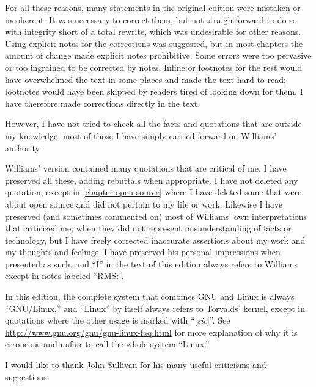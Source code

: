 \ifdefined\chs

\fi

\ifdefined\eng
For all these reasons, many statements in the original edition were
mistaken or incoherent.  It was necessary to correct them, but not
straightforward to do so with integrity short of a total rewrite,
which was undesirable for other reasons.  Using explicit notes for the
corrections was suggested, but in most chapters the amount of change
made explicit notes prohibitive.  Some errors were too pervasive or
too ingrained to be corrected by notes.  Inline or footnotes for the
rest would have overwhelmed the text in some places and made the text
hard to read; footnotes would have been skipped by readers tired of
looking down for them.  I have therefore made corrections directly in
the text.
\fi

\ifdefined\chs

\fi

\ifdefined\eng
However, I have not tried to check all the facts and quotations that
are outside my knowledge; most of those I have simply carried forward
on Williams' authority.
\fi

\ifdefined\chs

\fi

\ifdefined\eng
Williams' version contained many quotations that are critical of me.  I
have preserved all these, adding rebuttals when appropriate.  I have
not deleted any quotation, except in \autoref{chapter:open source} where I have deleted
some that were about open source and did not pertain to my life or
work.  Likewise I have preserved (and sometimes commented on) most of
Williams' own interpretations that criticized me, when they did not
represent misunderstanding of facts or technology, but I have freely
corrected inaccurate assertions about my work and my thoughts and
feelings.  I have preserved his personal impressions when presented as
such, and ``I'' in the text of this edition always refers to Williams
except in notes labeled ``RMS:''.
\fi

\ifdefined\chs

\fi

\ifdefined\eng
In this edition, the complete system that combines GNU and Linux is
always ``GNU/Linux,'' and ``Linux'' by itself always refers to Torvalds'
kernel, except in quotations where the other usage is marked with
``[\textit{sic}]''.  See \url{http://www.gnu.org/gnu/gnu-linux-faq.html} for more
explanation of why it is erroneous and unfair to call the whole system
``Linux.''
\fi

\ifdefined\chs

\fi

\ifdefined\eng
I would like to thank John Sullivan for his many useful criticisms and
suggestions.
\fi

\ifdefined\chs

\fi
